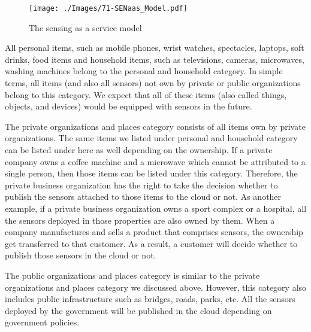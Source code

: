 \documentclass[conference]{IEEEtran}
\newenvironment{noindlist}
 {\begin{list}{\labelitemi}{\leftmargin=1.2em \itemindent=-.5em}}
 {\end{list}}
\begin{document}
\begin{figure}[t]
 \centering
\texttt{[image: ./Images/71-SENaas\_Model.pdf]}
\caption{The sensing as a service model}
 \label{Figure:SENaas_Model}	
\vspace{-0.63cm}	
\end{figure}










\vspace{-10pt}
\begin{noindlist}
\item All  personal items, such as mobile phones, wrist watches, spectacles, laptops, soft drinks, food items and household items, such as televisions, cameras, microwaves, washing machines belong to the personal and household category. In simple terms, all  items (and also all sensors) not own by private or public organizations belong to this category. We expect that all of these items (also called things, objects, and devices) would be equipped with sensors in the future.


\item The private organizations and places category consists of all  items own by private organizations. The same items we listed under personal and household category can be listed under here as well depending on the ownership. If a private company owns a coffee machine and a microwave which cannot be attributed to a single person, then those items can be listed under this category. Therefore, the private business organization has the right to take the decision whether to publish the sensors attached to those items to the cloud or not. As another example, if a private business organization owns a sport complex or a hospital, all the sensors deployed in those properties are also owned by them. When a company manufactures and sells a product that comprises sensors, the ownership get transferred to that customer. As a result, a customer will decide whether to publish those sensors in the cloud or not. 





\item The public organizations and places category is similar to the private organizations and places category we discussed above. However, this category also includes public infrastructure such as bridges, roads, parks, etc. All the sensors deployed by the government will be published in the cloud depending on government policies.



\end{noindlist}
\end{document}
